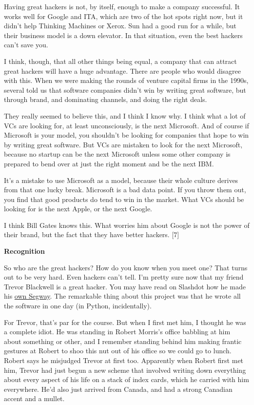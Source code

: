 Having great hackers is not, by itself, enough to make a company
successful. It works well for Google and ITA, which are two of the hot
spots right now, but it didn't help Thinking Machines or Xerox. Sun had
a good run for a while, but their business model is a down elevator. In
that situation, even the best hackers can't save you.

I think, though, that all other things being equal, a company that can
attract great hackers will have a huge advantage. There are people who
would disagree with this. When we were making the rounds of venture
capital firms in the 1990s, several told us that software companies
didn't win by writing great software, but through brand, and dominating
channels, and doing the right deals.

They really seemed to believe this, and I think I know why. I think what
a lot of VCs are looking for, at least unconsciously, is the next
Microsoft. And of course if Microsoft is your model, you shouldn't be
looking for companies that hope to win by writing great software. But
VCs are mistaken to look for the next Microsoft, because no startup can
be the next Microsoft unless some other company is prepared to bend over
at just the right moment and be the next IBM.

It's a mistake to use Microsoft as a model, because their whole culture
derives from that one lucky break. Microsoft is a bad data point. If you
throw them out, you find that good products do tend to win in the
market. What VCs should be looking for is the next Apple, or the next
Google.

I think Bill Gates knows this. What worries him about Google is not the
power of their brand, but the fact that they have better hackers.
{[}7{]}

\textbf{Recognition}

So who are the great hackers? How do you know when you meet one? That
turns out to be very hard. Even hackers can't tell. I'm pretty sure now
that my friend Trevor Blackwell is a great hacker. You may have read on
Slashdot how he made his \href{http://www.tlb.org/scooter.html}{own
Segway}. The remarkable thing about this project was that he wrote all
the software in one day (in Python, incidentally).

For Trevor, that's par for the course. But when I first met him, I
thought he was a complete idiot. He was standing in Robert Morris's
office babbling at him about something or other, and I remember standing
behind him making frantic gestures at Robert to shoo this nut out of his
office so we could go to lunch. Robert says he misjudged Trevor at first
too. Apparently when Robert first met him, Trevor had just begun a new
scheme that involved writing down everything about every aspect of his
life on a stack of index cards, which he carried with him everywhere.
He'd also just arrived from Canada, and had a strong Canadian accent and
a mullet.


